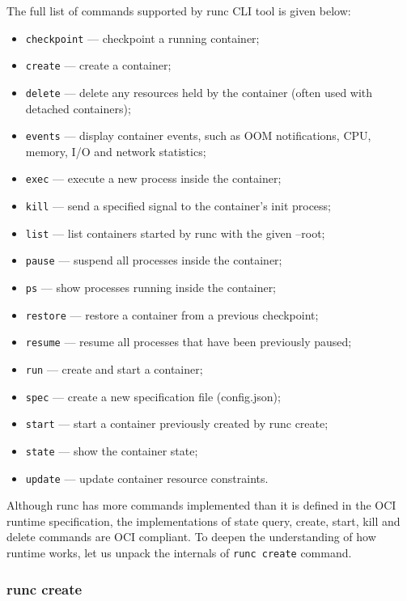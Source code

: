 The full list of commands supported by runc CLI tool is given below:
\begin{itemize}
  \item \texttt{checkpoint} — checkpoint a running container;
  \item \texttt{create} — create a container;
  \item \texttt{delete} — delete any resources held by the container (often used with detached containers);
  \item \texttt{events} — display container events, such as OOM notifications, CPU, memory, I/O and network statistics;
  \item \texttt{exec} — execute a new process inside the container;
  \item \texttt{kill} — send a specified signal to the container's init process;
  \item \texttt{list} — list containers started by runc with the given --root;
  \item \texttt{pause} — suspend all processes inside the container;
  \item \texttt{ps} — show processes running inside the container;
  \item \texttt{restore} — restore a container from a previous checkpoint;
  \item \texttt{resume} — resume all processes that have been previously paused;
  \item \texttt{run} — create and start a container;
  \item \texttt{spec} — create a new specification file (config.json);
  \item \texttt{start} — start a container previously created by runc create;
  \item \texttt{state} — show the container state;
  \item \texttt{update} — update container resource constraints.
\end{itemize}

Although runc has more commands implemented than it is defined in the OCI runtime specification, the implementations of state query, create, start, kill and delete commands are OCI compliant. To deepen the understanding of how runtime works, let us unpack the internals of \texttt{runc create} command.

\subsubsection*{runc create}

